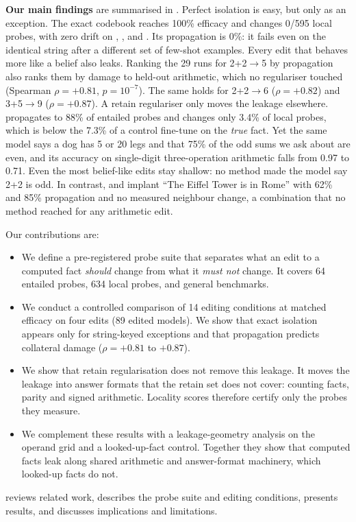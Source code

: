 {\bf Our main findings} are summarised in . Perfect isolation is easy, but only as an exception. The exact codebook reaches 100\% efficacy and changes 0/595 local probes, with zero drift on \mmlu, \gsm, \counterfact and \wikitext. Its propagation is 0\%: it fails even on the identical string after a different set of few-shot examples. Every edit that behaves more like a belief also leaks. Ranking the 29 runs for 2+2$\to$5 by propagation also ranks them by damage to held-out \eleuther arithmetic, which no regulariser touched (Spearman $\rho=+0.81$, $p=10^{-7}$). The same holds for 2+2$\to$6 ($\rho=+0.82$) and 3+5$\to$9 ($\rho=+0.87$). A retain regulariser only moves the leakage elsewhere. \ftentailr propagates to 88\% of entailed probes and changes only 3.4\% of local probes, which is below the 7.3\% of a control fine-tune on the \emph{true} fact. Yet the same model says a dog has 5 or 20 legs and that 75\% of the odd sums we ask about are even, and its accuracy on single-digit three-operation arithmetic falls from 0.97 to 0.71. Even the most belief-like edits stay shallow: no method made the model say 2+2 is odd. In contrast, \rome and \ftentailr implant ``The Eiffel Tower is in Rome'' with 62\% and 85\% propagation and no measured neighbour change, a combination that no method reached for any arithmetic edit.

Our contributions are:
\begin{itemize}[leftmargin=*,itemsep=0pt,topsep=0pt]
    \item We define a pre-registered probe suite that separates what an edit to a computed fact \emph{should} change from what it \emph{must not} change. It covers 64 entailed probes, 634 local probes, and general benchmarks.
    \item We conduct a controlled comparison of 14 editing conditions at matched efficacy on four edits (89 edited models). We show that exact isolation appears only for string-keyed exceptions and that propagation predicts collateral damage ($\rho=+0.81$ to $+0.87$).
    \item We show that retain regularisation does not remove this leakage. It moves the leakage into answer formats that the retain set does not cover: counting facts, parity and signed arithmetic. Locality scores therefore certify only the probes they measure.
    \item We complement these results with a leakage-geometry analysis on the operand grid and a looked-up-fact control. Together they show that computed facts leak along shared arithmetic and answer-format machinery, which looked-up facts do not.
\end{itemize}

 reviews related work,  describes the probe suite and editing conditions,  presents results, and  discusses implications and limitations.
